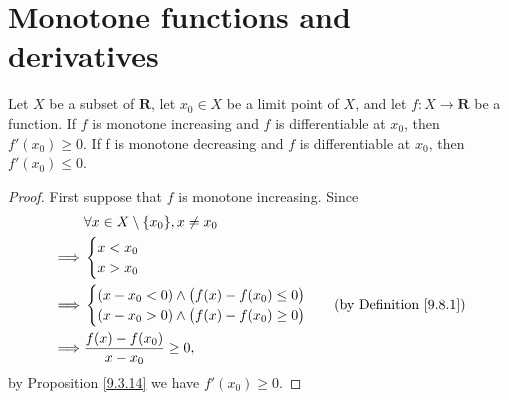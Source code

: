 \section{Monotone functions and derivatives}\label{sec 10.3}

\begin{proposition}\label{10.3.1}
    Let \(X\) be a subset of \(\mathbf{R}\), let \(x_0 \in X\) be a limit point of \(X\), and let \(f : X \to \mathbf{R}\) be a function.
    If \(f\) is monotone increasing and \(f\) is differentiable at \(x_0\), then \(f'(x_0) \geq 0\).
    If f is monotone decreasing and \(f\) is differentiable at \(x_0\), then \(f'(x_0) \leq 0\).
\end{proposition}

\begin{proof}
    First suppose that \(f\) is monotone increasing.
    Since
    \begin{align*}
                 & \forall x \in X \setminus \{x_0\}, x \neq x_0      \\
        \implies & \begin{cases}
                       x < x_0 \\
                       x > x_0 \\
                   \end{cases}                                       \\
        \implies & \begin{cases}
                       (x - x_0 < 0) \land \big(f(x) - f(x_0) \leq 0\big) \\
                       (x - x_0 > 0) \land \big(f(x) - f(x_0) \geq 0\big) \\
                   \end{cases} & \text{(by Definition \ref{9.8.1})} \\
        \implies & \frac{f(x) - f(x_0)}{x - x_0} \geq 0,
    \end{align*}
    by Proposition \ref{9.3.14} we have \(f'(x_0) \geq 0\).


\end{proof}
